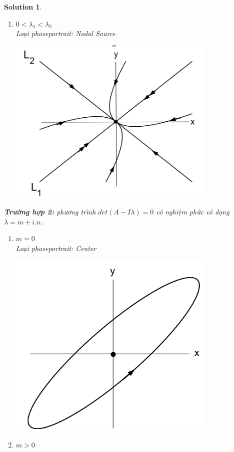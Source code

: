 \documentclass[a4paper]{article}
\newtheorem*{sol}{Solution}
\begin{document}
\begin{sol}
\begin{enumerate}
    
    \item $0<\lambda_1< \lambda _2$\\
    Loại phaseportrait: Nodal Source\\
    \begin{center}
        \includegraphics[width=100mm]{image/BT1/Nodal Source.png}
   \end{center}
\end{enumerate}
\textbf{Trường hợp 2:} phương trình $det(A-I \lambda)= 0$ có nghiệm phức có dạng $\lambda= m+i.n$.
\begin{enumerate}
    \item $m=0$\\
    Loại phaseportrait: Center
    \begin{center}
        \includegraphics[width=100mm]{image/BT1/Center.png}
   \end{center}
    \item $m>0$\\

\end{enumerate}
\end{sol}
\end{document}
